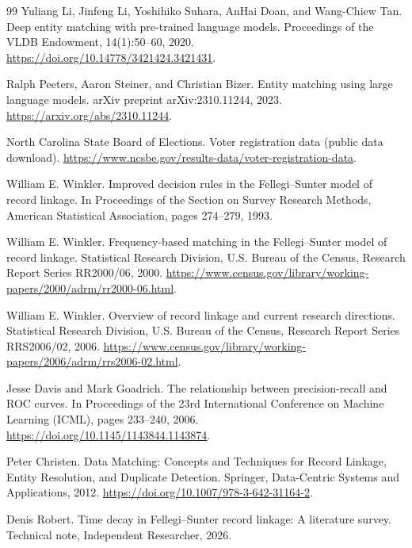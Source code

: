 \documentclass[11pt]{article}
\begin{document}
\begin{thebibliography}{99}
Yuliang Li, Jinfeng Li, Yoshihiko Suhara, AnHai Doan, and Wang-Chiew Tan.
\newblock Deep entity matching with pre-trained language models.
\newblock Proceedings of the VLDB Endowment, 14(1):50--60, 2020.
\newblock \url{https://doi.org/10.14778/3421424.3421431}.

Ralph Peeters, Aaron Steiner, and Christian Bizer.
\newblock Entity matching using large language models.
\newblock arXiv preprint arXiv:2310.11244, 2023.
\newblock \url{https://arxiv.org/abs/2310.11244}.

North Carolina State Board of Elections.
\newblock Voter registration data (public data download).
\newblock \url{https://www.ncsbe.gov/results-data/voter-registration-data}.

William E. Winkler.
\newblock Improved decision rules in the Fellegi--Sunter model of record linkage.
\newblock In Proceedings of the Section on Survey Research Methods, American Statistical Association, pages 274--279, 1993.

William E. Winkler.
\newblock Frequency-based matching in the Fellegi--Sunter model of record linkage.
\newblock Statistical Research Division, U.S. Bureau of the Census, Research Report Series RR2000/06, 2000.
\newblock \url{https://www.census.gov/library/working-papers/2000/adrm/rr2000-06.html}.

William E. Winkler.
\newblock Overview of record linkage and current research directions.
\newblock Statistical Research Division, U.S. Bureau of the Census, Research Report Series RRS2006/02, 2006.
\newblock \url{https://www.census.gov/library/working-papers/2006/adrm/rrs2006-02.html}.

Jesse Davis and Mark Goadrich.
\newblock The relationship between precision-recall and ROC curves.
\newblock In Proceedings of the 23rd International Conference on Machine Learning (ICML), pages 233--240, 2006.
\newblock \url{https://doi.org/10.1145/1143844.1143874}.

Peter Christen.
\newblock Data Matching: Concepts and Techniques for Record Linkage, Entity Resolution, and Duplicate Detection.
\newblock Springer, Data-Centric Systems and Applications, 2012.
\newblock \url{https://doi.org/10.1007/978-3-642-31164-2}.

Denis Robert.
\newblock Time decay in Fellegi--Sunter record linkage: A literature survey.
\newblock Technical note, Independent Researcher, 2026.


\end{thebibliography}
\end{document}

